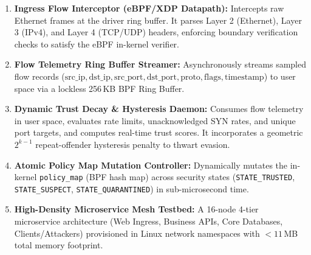 \documentclass[conference]{IEEEtran}
\begin{document}
\begin{enumerate}
    \item \textbf{Ingress Flow Interceptor (eBPF/XDP Datapath):} Intercepts raw Ethernet frames at the driver ring buffer. It parses Layer 2 (Ethernet), Layer 3 (IPv4), and Layer 4 (TCP/UDP) headers, enforcing boundary verification checks to satisfy the eBPF in-kernel verifier.
    \item \textbf{Flow Telemetry Ring Buffer Streamer:} Asynchronously streams sampled flow records ($\text{src\_ip}, \text{dst\_ip}, \text{src\_port}, \text{dst\_port}, \text{proto}, \text{flags}, \text{timestamp}$) to user space via a lockless 256\,KB BPF Ring Buffer.
    \item \textbf{Dynamic Trust Decay \& Hysteresis Daemon:} Consumes flow telemetry in user space, evaluates rate limits, unacknowledged SYN rates, and unique port targets, and computes real-time trust scores. It incorporates a geometric $2^{k-1}$ repeat-offender hysteresis penalty to thwart evasion.
    \item \textbf{Atomic Policy Map Mutation Controller:} Dynamically mutates the in-kernel \texttt{policy\_map} (BPF hash map) across security states (\texttt{STATE\_TRUSTED}, \texttt{STATE\_SUSPECT}, \texttt{STATE\_QUARANTINED}) in sub-microsecond time.
    \item \textbf{High-Density Microservice Mesh Testbed:} A 16-node 4-tier microservice architecture (Web Ingress, Business APIs, Core Databases, Clients/Attackers) provisioned in Linux network namespaces with $<11$\,MB total memory footprint.
\end{enumerate}
\end{document}
